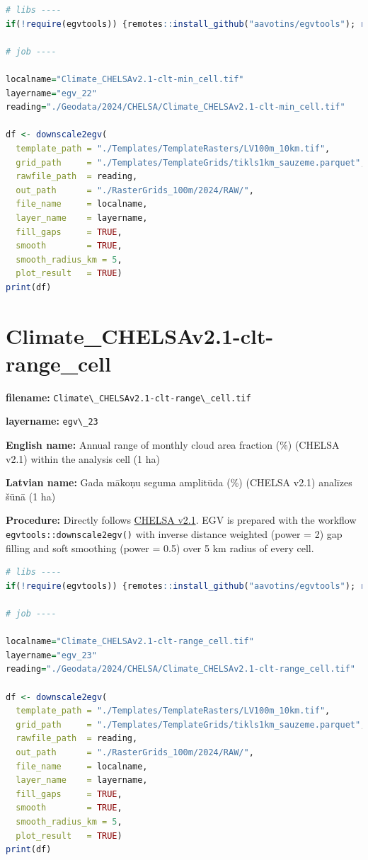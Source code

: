 \documentclass[
]{book}
\newcommand{\passthrough}[1]{#1}
\begin{document}
\begin{lstlisting}[language=R]
# libs ----
if(!require(egvtools)) {remotes::install_github("aavotins/egvtools"); require(egvtools)}

# job ----

localname="Climate_CHELSAv2.1-clt-min_cell.tif"
layername="egv_22"
reading="./Geodata/2024/CHELSA/Climate_CHELSAv2.1-clt-min_cell.tif"

df <- downscale2egv(
  template_path = "./Templates/TemplateRasters/LV100m_10km.tif",
  grid_path     = "./Templates/TemplateGrids/tikls1km_sauzeme.parquet",
  rawfile_path  = reading,
  out_path      = "./RasterGrids_100m/2024/RAW/",
  file_name     = localname,
  layer_name    = layername,
  fill_gaps     = TRUE,
  smooth        = TRUE,
  smooth_radius_km = 5,
  plot_result   = TRUE)
print(df)
\end{lstlisting}

\section{Climate\_CHELSAv2.1-clt-range\_cell}\label{ch06.023}

\textbf{filename:} \passthrough{\lstinline!Climate\_CHELSAv2.1-clt-range\_cell.tif!}

\textbf{layername:} \passthrough{\lstinline!egv\_23!}

\textbf{English name:} Annual range of monthly cloud area fraction (\%) (CHELSA v2.1) within the analysis cell (1 ha)

\textbf{Latvian name:} Gada mākoņu seguma amplitūda (\%) (CHELSA v2.1) analīzes šūnā (1 ha)

\textbf{Procedure:} Directly follows \hyperref[Ch04.11]{CHELSA v2.1}. EGV is prepared with the
workflow \passthrough{\lstinline!egvtools::downscale2egv()!} with inverse distance weighted (power = 2)
gap filling and soft smoothing (power = 0.5) over 5 km radius of every cell.

\begin{lstlisting}[language=R]
# libs ----
if(!require(egvtools)) {remotes::install_github("aavotins/egvtools"); require(egvtools)}

# job ----

localname="Climate_CHELSAv2.1-clt-range_cell.tif"
layername="egv_23"
reading="./Geodata/2024/CHELSA/Climate_CHELSAv2.1-clt-range_cell.tif"

df <- downscale2egv(
  template_path = "./Templates/TemplateRasters/LV100m_10km.tif",
  grid_path     = "./Templates/TemplateGrids/tikls1km_sauzeme.parquet",
  rawfile_path  = reading,
  out_path      = "./RasterGrids_100m/2024/RAW/",
  file_name     = localname,
  layer_name    = layername,
  fill_gaps     = TRUE,
  smooth        = TRUE,
  smooth_radius_km = 5,
  plot_result   = TRUE)
print(df)
\end{lstlisting}
\end{document}
